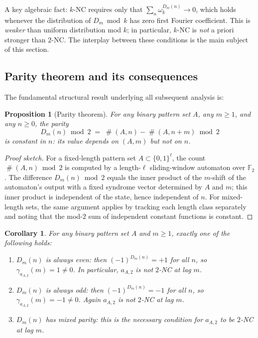 \documentclass[11pt]{article}
\newtheorem{proposition}[theorem]{Proposition}
\newtheorem{corollary}[theorem]{Corollary}
\theoremstyle{definition}
\DeclareMathOperator{\occ}{\#}
\begin{document}
A key algebraic fact: $k$-NC requires only that $\sum_n \omega_k^{D_m(n)}
\to 0$, which holds whenever the distribution of $D_m \bmod k$ has zero
first Fourier coefficient.  This is \emph{weaker} than uniform distribution
mod $k$; in particular, $k$-NC is \emph{not} a priori stronger than
$2$-NC.  The interplay between these conditions is the main subject of
this section.

\subsection{Parity theorem and its consequences}
\label{subsec:parity}

The fundamental structural result underlying all subsequent analysis is:

\begin{proposition}[Parity theorem]
\label{prop:parity}
For any binary pattern set $A$, any $m \geq 1$, and any $n \geq 0$,
the parity
\[
    D_m(n) \bmod 2 \;=\; \occ(A,n) - \occ(A,n+m) \bmod 2
\]
is \emph{constant} in $n$: its value depends on $(A, m)$ but not on $n$.
\end{proposition}

\begin{proof}[Proof sketch]
For a fixed-length pattern set $A \subset \{0,1\}^\ell$, the count
$\occ(A,n) \bmod 2$ is computed by a length-$\ell$ sliding-window
automaton over $\mathbb{F}_2$.  The difference $D_m(n) \bmod 2$
equals the inner product of the $m$-shift of the automaton's output
with a fixed syndrome vector determined by $A$ and $m$; this inner
product is independent of the state, hence independent of $n$.
For mixed-length sets, the same argument applies by tracking each
length class separately and noting that the mod-$2$ sum of independent
constant functions is constant.
\end{proof}

\begin{corollary}
\label{cor:parity_dichotomy}
For any binary pattern set $A$ and $m \geq 1$, exactly one of the
following holds:
\begin{enumerate}
    \item $D_m(n)$ is always \emph{even}: then $(-1)^{D_m(n)} = +1$
          for all $n$, so $\gamma_{a_{A,2}}(m) = 1 \neq 0$.
          In particular, $a_{A,2}$ is \emph{not} $2$-NC at lag $m$.
    \item $D_m(n)$ is always \emph{odd}: then $(-1)^{D_m(n)} = -1$
          for all $n$, so $\gamma_{a_{A,2}}(m) = -1 \neq 0$.
          Again $a_{A,2}$ is not $2$-NC at lag $m$.
    \item $D_m(n)$ has \emph{mixed parity}: this is the necessary
          condition for $a_{A,2}$ to be $2$-NC at lag $m$.
\end{enumerate}
\end{corollary}
\end{document}
